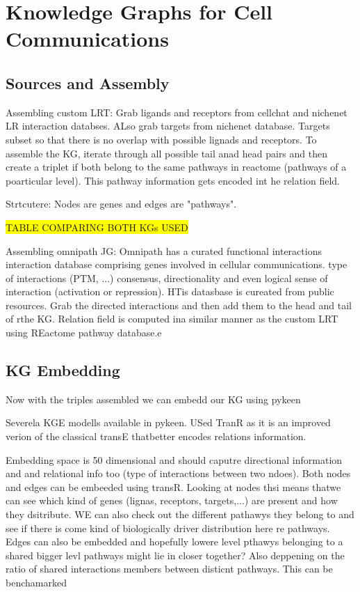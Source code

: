 \section{Knowledge Graphs for Cell Communications}

\subsection{Sources and Assembly}

Assembling custom LRT:
Grab ligands and receptors from cellchat and nichenet LR interaction databses. ALso grab targets from nichenet database.
Targets subset so that there is no overlap with possible lignads and receptors.
To assemble the KG, iterate through all possible tail anad head pairs and then create a triplet if both belong to the same pathways in reactome (pathways of a poarticular level).
This pathway information gets encoded int he relation field.

Strtcutere: Nodes are genes and edges are "pathways".

\colorbox{yellow}{TABLE COMPARING BOTH KGs USED}

Assembling omnipath JG: \cite{turei_integrated_2021}
Omnipath has a curated functional interactions interaction database comprising genes involved in cellular communications. type of interactions (PTM, ...) consensus, directionality and even logical sense of interaction (activation or repression). HTis datasbase is cureated from public resources.
Grab the directed interactions and then add them to the head and tail of rthe KG. Relation field is computed ina  similar manner as the custom LRT using REactome pathway database.e


\subsection{KG Embedding}

Now with the triples assembled we can embedd our KG using pykeen \cite{ali_pykeen_2021}

Severela KGE modells available in pykeen. USed TranR \cite{lin_learning_2015} as it is an improved verion of the classical transE \cite{bordes_translating_2013} thatbetter encodes relations information. 

Embedding space is 50 dimensional and should caputre directional information and and relational info too (type of interactions between two ndoes).
Both nodes and edges can be embeeded using transR. 
Looking at nodes thsi means thatwe can see which kind of genes (lignas, receptors, targets,...) are present and how they dsitribute. WE can also check out the different pathawys they belong to and see if there is come kind of biologically driver distribution here re pathways.
Edges can also be embedded and hopefully lowere level pthawys belonging to a shared bigger levl pathways might lie in closer together? Also deppening on the ratio of shared interactions members between disticnt pathways. 
This can be benchamarked



